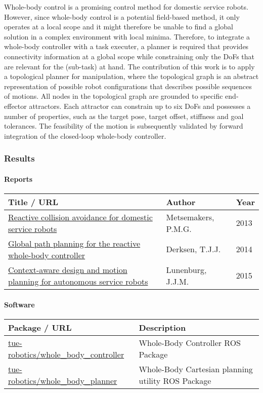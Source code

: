 Whole-body control is a promising control method for domestic service robots. However, since whole-body control is a potential field-based method, it only operates at a local scope and it might therefore be unable to find a global solution in a complex environment with local minima. Therefore, to integrate a whole-body controller with a task executer, a planner is required that
provides connectivity information at a global scope while constraining only the DoFs that are relevant for the (sub-task) at hand.
The contribution of this work is to apply a topological planner for manipulation, where the topological graph is an abstract representation of possible robot configurations that describes possible sequences of motions.
All nodes in the topological graph are grounded to specific end-effector attractors. Each attractor can constrain up to six DoFs and possesses a number of properties, such as the target pose, target offset, stiffness and goal tolerances. The feasibility of the motion is subsequently validated by forward integration of the closed-loop whole-body controller.

\subsubsection{Results}

\paragraph{Reports}
\begin{longtable}{|p{8.5cm}p{4cm}p{2cm}|}
\hline
\rowcolor[gray]{0.8} \bf Title / URL & \bf Author & \bf Year \\
\hline
\href{http://repository.tue.nl/762360}{Reactive collision avoidance for domestic service robots} & Metsemakers, P.M.G. & 2013 \\
\href{http://repository.tue.nl/778410}{Global path planning for the reactive whole-body controller} & Derksen, T.J.J. & 2014 \\
\href{http://repository.tue.nl/794842}{Context-aware design and motion planning for autonomous service robots} & Lunenburg, J.J.M. & 2015 \\
\hline
\end{longtable}

\paragraph{Software}
\begin{longtable}{|p{6cm}p{9cm}|}
\hline
\rowcolor[gray]{0.8} \bf Package / URL & \bf Description\\
\hline
\href{https://github.com/tue-robotics/amigo_whole_body_controller}{tue-robotics/whole\_body\_controller} & Whole-Body Controller ROS Package \\
\href{https://github.com/tue-robotics/whole_body_planner}{tue-robotics/whole\_body\_planner} & Whole-Body Cartesian planning utility ROS Package \\
\hline
\end{longtable}

